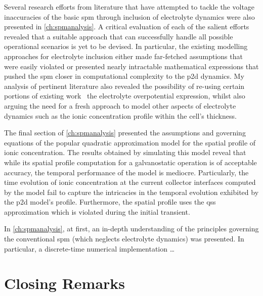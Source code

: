 
Several  research efforts  from literature  that  have attempted  to tackle  the
voltage inaccuracies  of the  basic \gls{spm}  through inclusion  of electrolyte
dynamics were also presented in  \cref{ch:spmanalysis}. A critical evaluation of
each  of  the  salient  efforts  revealed that  a  suitable  approach  that  can
successfully handle all possible operational scenarios  is yet to be devised. In
particular, the  existing modelling approaches for  electrolyte inclusion either
made  far-fetched assumptions  that  were easily  violated  or presented  nearly
intractable  mathematical  expressions  that  pushed  the  \gls{spm}  closer  in
computational complexity  to the  \gls{p2d} dynamics.  My analysis  of pertinent
literature  also  revealed  the  possibility of  re-using  certain  portions  of
existing work \eg~the electrolyte  overpotential expression, whilst also arguing
the need  for a fresh  approach to model  other aspects of  electrolyte dynamics
such as the ionic concentration profile within the cell's thickness.

The  final  section  of  \cref{ch:spmanalysis}  presented  the  assumptions  and
governing equations of the popular quadratic approximation model for the spatial
profile of  ionic concentration. The  results obtained by simulating  this model
reveal that while its spatial  profile computation for a galvanostatic operation
is of  acceptable accuracy, the temporal  performance of the model  is mediocre.
Particularly, the time evolution of ionic concentration at the current collector
interfaces computed by the model fail to capture the intricacies in the temporal
evolution exhibited by  the \gls{p2d} model's profile.  Furthermore, the spatial
profile uses  the \gls{qss} approximation  which is violated during  the initial
transient.

In \cref{ch:spmanalysis}, at first, an  in-depth understanding of the principles
governing the  conventional \gls{spm} (which neglects  electrolyte dynamics) was
presented. In particular, a discrete-time numerical implementation \dots

\section{Closing Remarks}

